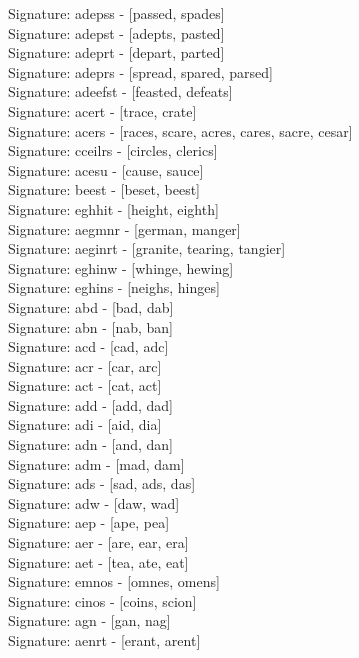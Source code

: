 Signature: {adepss} - [passed, spades] \\
Signature: {adepst} - [adepts, pasted] \\
Signature: {adeprt} - [depart, parted] \\
Signature: {adeprs} - [spread, spared, parsed] \\
Signature: {adeefst} - [feasted, defeats] \\
Signature: {acert} - [trace, crate] \\
Signature: {acers} - [races, scare, acres, cares, sacre, cesar] \\
Signature: {cceilrs} - [circles, clerics] \\
Signature: {acesu} - [cause, sauce] \\
Signature: {beest} - [beset, beest] \\
Signature: {eghhit} - [height, eighth] \\
Signature: {aegmnr} - [german, manger] \\
Signature: {aeginrt} - [granite, tearing, tangier] \\
Signature: {eghinw} - [whinge, hewing] \\
Signature: {eghins} - [neighs, hinges] \\
Signature: {abd} - [bad, dab] \\
Signature: {abn} - [nab, ban] \\
Signature: {acd} - [cad, adc] \\
Signature: {acr} - [car, arc] \\
Signature: {act} - [cat, act] \\
Signature: {add} - [add, dad] \\
Signature: {adi} - [aid, dia] \\
Signature: {adn} - [and, dan] \\
Signature: {adm} - [mad, dam] \\
Signature: {ads} - [sad, ads, das] \\
Signature: {adw} - [daw, wad] \\
Signature: {aep} - [ape, pea] \\
Signature: {aer} - [are, ear, era] \\
Signature: {aet} - [tea, ate, eat] \\
Signature: {emnos} - [omnes, omens] \\
Signature: {cinos} - [coins, scion] \\
Signature: {agn} - [gan, nag] \\
Signature: {aenrt} - [erant, arent] \\
